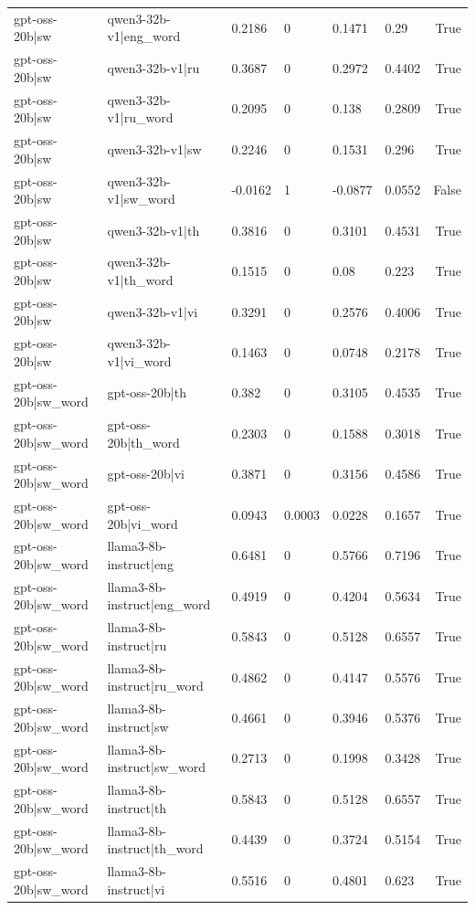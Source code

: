 \begin{table}
\begin{tabular}{llllllr}
gpt-oss-20b|sw & qwen3-32b-v1|eng_word & 0.2186 & 0 & 0.1471 & 0.29 & True \\
gpt-oss-20b|sw & qwen3-32b-v1|ru & 0.3687 & 0 & 0.2972 & 0.4402 & True \\
gpt-oss-20b|sw & qwen3-32b-v1|ru_word & 0.2095 & 0 & 0.138 & 0.2809 & True \\
gpt-oss-20b|sw & qwen3-32b-v1|sw & 0.2246 & 0 & 0.1531 & 0.296 & True \\
gpt-oss-20b|sw & qwen3-32b-v1|sw_word & -0.0162 & 1 & -0.0877 & 0.0552 & False \\
gpt-oss-20b|sw & qwen3-32b-v1|th & 0.3816 & 0 & 0.3101 & 0.4531 & True \\
gpt-oss-20b|sw & qwen3-32b-v1|th_word & 0.1515 & 0 & 0.08 & 0.223 & True \\
gpt-oss-20b|sw & qwen3-32b-v1|vi & 0.3291 & 0 & 0.2576 & 0.4006 & True \\
gpt-oss-20b|sw & qwen3-32b-v1|vi_word & 0.1463 & 0 & 0.0748 & 0.2178 & True \\
gpt-oss-20b|sw_word & gpt-oss-20b|th & 0.382 & 0 & 0.3105 & 0.4535 & True \\
gpt-oss-20b|sw_word & gpt-oss-20b|th_word & 0.2303 & 0 & 0.1588 & 0.3018 & True \\
gpt-oss-20b|sw_word & gpt-oss-20b|vi & 0.3871 & 0 & 0.3156 & 0.4586 & True \\
gpt-oss-20b|sw_word & gpt-oss-20b|vi_word & 0.0943 & 0.0003 & 0.0228 & 0.1657 & True \\
gpt-oss-20b|sw_word & llama3-8b-instruct|eng & 0.6481 & 0 & 0.5766 & 0.7196 & True \\
gpt-oss-20b|sw_word & llama3-8b-instruct|eng_word & 0.4919 & 0 & 0.4204 & 0.5634 & True \\
gpt-oss-20b|sw_word & llama3-8b-instruct|ru & 0.5843 & 0 & 0.5128 & 0.6557 & True \\
gpt-oss-20b|sw_word & llama3-8b-instruct|ru_word & 0.4862 & 0 & 0.4147 & 0.5576 & True \\
gpt-oss-20b|sw_word & llama3-8b-instruct|sw & 0.4661 & 0 & 0.3946 & 0.5376 & True \\
gpt-oss-20b|sw_word & llama3-8b-instruct|sw_word & 0.2713 & 0 & 0.1998 & 0.3428 & True \\
gpt-oss-20b|sw_word & llama3-8b-instruct|th & 0.5843 & 0 & 0.5128 & 0.6557 & True \\
gpt-oss-20b|sw_word & llama3-8b-instruct|th_word & 0.4439 & 0 & 0.3724 & 0.5154 & True \\
gpt-oss-20b|sw_word & llama3-8b-instruct|vi & 0.5516 & 0 & 0.4801 & 0.623 & True \\

\end{tabular}
\end{table}
